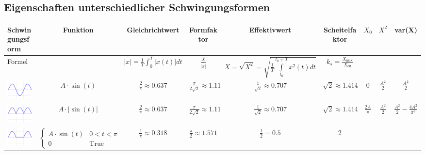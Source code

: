 \begin{table}
\subsection{Eigenschaften unterschiedlicher Schwingungsformen}
\begin{center}
\begin{tabular}{|l|c|c|c|c|c|c|c|c|}
\hline
	Schwingungsform & Funktion & Gleichrichtwert & Formfaktor &
	Effektivwert & Scheitelfaktor & \textbf{$X_0$} & \textbf{$X^2$} & \textbf{var(X)} \\
\hline
	Formel &
	&
	$\overline{\left|x\right|} = \frac1T\int_{0}^{T}\left| x(t)\right|dt$&
	$\frac{X}{\overline{\left|x\right|}}$&
	$X = \sqrt{X^2} = \sqrt{\frac{1}{T} \int\limits ^{t_0+T}_{t_0}{x^2(t)dt}}$&
	$k_{s}=\frac{X_{\mathrm{max}}}{X_{\mathrm{eff}}}$&
	&
	&
	\\
\hline
	\includegraphics[width=2cm]{table/images/table_sine_wave.png} &
	$A\cdot\sin(t)$ &
	$\frac{2}{\pi} \approx 0.637$ &
	$\frac{\pi}{2\sqrt{2}} \approx 1.11$ &
	$\frac{1}{\sqrt{2}}\approx 0.707$ &
	$\sqrt{2}\approx 1.414$ &
	$0$ &
	$\frac{A^2}{2}$ &
	$\frac{A^2}{2}$ \\
\hline	
	\includegraphics[width=2cm]{table/images/table_full-wave_rectified_sine.png} &
	$A\cdot|\sin(t)|$ &
	$\frac{2}{\pi} \approx 0.637$ &
	$\frac{\pi}{2\sqrt{2}} \approx 1.11$ &
	$\frac{1}{\sqrt{2}} \approx 0.707$ &
	$\sqrt{2} \approx 1.414$  &
	$\frac{2A}{\pi}$ & $\frac{A^2}{2}$ & $\frac{A^2}{2}-\frac{4A^2}{\pi^2}$
	\\
\hline
	\includegraphics[width=2cm]{table/images/table_half-wave_rectified_sine.png} &
	$\begin{cases} A\cdot\sin (t) & 0<t<\pi  \\ 0 & \text{True}\end{cases}$ &
	$\frac{1}{\pi}\approx 0.318$ &
	$\frac{\pi}{2}\approx 1.571$ &
	$\frac{1}{2} = 0.5$	&
	2  &

\end{tabular}
\end{center}
\end{table}
